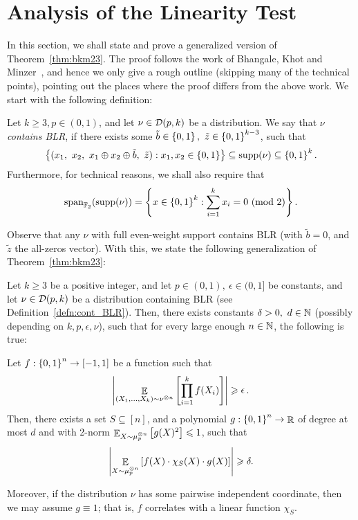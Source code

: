 \section{Analysis of the Linearity Test}\label{sec:bkm_sketch}

In this section, we shall state and prove a generalized version of Theorem~\ref{thm:bkm23}.
The proof follows the work of Bhangale, Khot and Minzer~\cite{BKM23b}, and hence we only give a rough outline (skipping many of the technical points), pointing out the places where the proof differs from the above work.
We start with the following definition:

\begin{definition}\label{defn:cont_BLR}
	Let $k\geq 3,p\in (0,1)$, and let $\nu\in \mathcal D(p,k)$ be a distribution.
	We say that $\nu$ \emph{contains BLR}, if there exists some $\tilde{b}\in \left\{ 0,1 \right\},\ \tilde{z}\in \left\{ 0,1 \right\}^{k-3}$, such that 
	\[ \set{(x_1,\ x_2,\ x_1\oplus x_2\oplus \tilde{b},\ \tilde{z}) : x_1,x_2\in \set{0,1}}\subseteq \supp(\nu)\subseteq \set{0,1}^k. \]	
	Furthermore, for technical reasons, we shall also require that \[\textnormal{span}_{\mathbb{F}_2}(\textnormal{supp}(\nu)) = \left\{ x\in \left\{ 0,1 \right\}^k : \sum_{i=1}^k x_i = 0\textnormal{ (mod 2)} \right\} .\]
\end{definition}

Observe that any $\nu$ with full even-weight support contains BLR (with $\tilde{b}=0$, and $\tilde{z}$ the all-zeros vector).
With this, we state the following generalization of Theorem~\ref{thm:bkm23}:

\begin{theorem}\label{thm:bkm23_in_section}
	Let $k\geq 3$ be a positive integer, and let $p\in (0,1),\ \epsilon \in (0,1]$ be constants, and let $\nu \in \mathcal D(p,k)$ be a distribution containing BLR (see Definition~\ref{defn:cont_BLR}).
	Then, there exists constants $\delta>0,\ d\in \mathbb{N}$ (possibly depending on $k, p, \epsilon, \nu$), such that for every large enough $n\in \mathbb{N}$, the following is true:
	
	Let $f:\left\{ 0,1 \right\}^n\to[-1,1]$ be a function such that \[ \left|\mathop{\mathbb{E}}_{(X_1,\dots,X_k)\sim \nu^{\otimes n}} \left[ \prod_{i=1}^k f(X_i) \right] \right|\geqslant \mathop{\epsilon}.\]
	Then, there exists a set $S\subseteq [n]$, and a polynomial $g:\left\{ 0,1 \right\}^n\to \mathop{\mathbb{R}}$ of degree at most $d$ and with 2-norm $\mathop{\mathbb{E}}_{X\sim \mu_p^{\otimes n} }\left[ g(X)^2 \right]\leqslant 1$, such that
	\[ \left|\mathop{\mathbb{E}}_{X\sim \mu_p^{\otimes n}}\left[ f(X)\cdot \chi_S(X)\cdot g(X) \right]\right| \geqslant \delta .\]
	
	Moreover, if the distribution $\nu$ has some pairwise independent coordinate, then we may assume $g\equiv 1$; that is, $f$ correlates with a linear function $\chi_S$.
\end{theorem}

